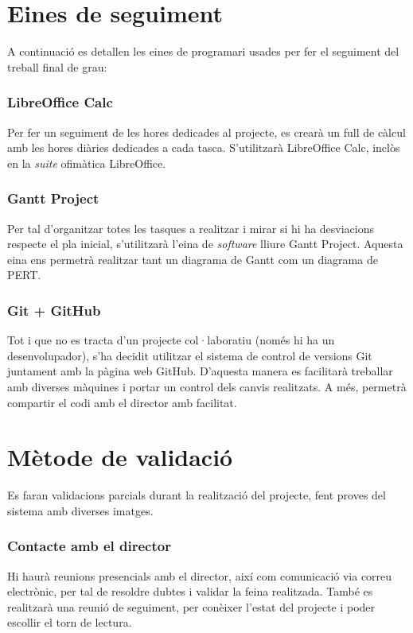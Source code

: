 \section{Eines de seguiment}
	A continuació es detallen les eines de programari usades per fer el seguiment del treball final de grau:
	\subsubsection{LibreOffice Calc}
		Per fer un seguiment de les hores dedicades al projecte, es crearà un full de càlcul amb les hores diàries dedicades a cada tasca. S'utilitzarà LibreOffice Calc, inclòs en
		la \textit{suite} ofimàtica LibreOffice.
	\subsubsection{Gantt Project}
		Per tal d'organitzar totes les tasques a realitzar i mirar si hi ha desviacions respecte el pla inicial, s'utilitzarà l'eina de \textit{software} lliure 
		Gantt Project\cite{GanttProject}. Aquesta eina ens permetrà realitzar tant un diagrama de Gantt com un diagrama de PERT.
	\subsubsection{Git + GitHub}
		Tot i que no es tracta d'un projecte col·laboratiu (només hi ha un desenvolupador), s'ha decidit utilitzar el sistema de control de versions Git juntament amb la pàgina web GitHub.
		D'aquesta manera es facilitarà treballar amb diverses màquines i portar un control dels canvis realitzats. A més, permetrà compartir el codi amb el director amb facilitat.
	\section{Mètode de validació}
		Es faran validacions parcials durant la realització del projecte, fent proves del sistema amb diverses imatges.
	\subsubsection{Contacte amb el director}
		Hi haurà reunions presencials amb el director, així com comunicació via correu electrònic, per tal de resoldre dubtes i validar la feina realitzada. També es realitzarà una reunió de seguiment,
		per conèixer l'estat del projecte i poder escollir el torn de lectura.

